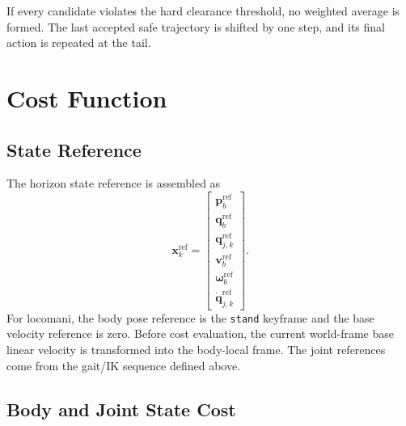 \documentclass[11pt,a4paper]{article}
\newcommand{\code}[1]{\texttt{#1}}
\begin{document}
If every candidate violates the hard clearance threshold, no weighted average
is formed. The last accepted safe trajectory is shifted by one step, and its
final action is repeated at the tail.

\section{Cost Function}

\subsection{State Reference}

The horizon state reference is assembled as
\begin{equation}
  \bm{x}^{\mathrm{ref}}_k=
  \begin{bmatrix}
    \bm{p}^{\mathrm{ref}}_b\\
    \bm{q}^{\mathrm{ref}}_b\\
    \bm{q}^{\mathrm{ref}}_{j,k}\\
    \bm{v}^{\mathrm{ref}}_b\\
    \bm{\omega}^{\mathrm{ref}}_b\\
    \dot{\bm{q}}^{\mathrm{ref}}_{j,k}
  \end{bmatrix}.
\end{equation}
For locomani, the body pose reference is the \code{stand} keyframe and the
base velocity reference is zero. Before cost evaluation, the current
world-frame base linear velocity is transformed into the body-local frame.
The joint references come from the gait/IK sequence defined above.

\subsection{Body and Joint State Cost}
\end{document}
